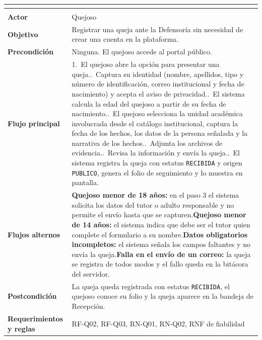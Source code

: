 \begingroup
{}
\small
\renewcommand{\arraystretch}{1.25}
\setlength{\tabcolsep}{4pt}
\begin{longtable}{|L{3.2cm}|L{12.4cm}|}
	\hline
	 \\
	\hline
	\endfirsthead
	\hline
	 \\
	\hline
	\endhead
	\textbf{Actor} & Quejoso \\ \hline
	\textbf{Objetivo} & Registrar una queja ante la Defensoría sin necesidad de crear una cuenta en la plataforma. \\ \hline
	\textbf{Precondición} & Ninguna. El quejoso accede al portal público. \\ \hline
	\textbf{Flujo principal} & 1.~El quejoso abre la opción para presentar una queja..~Captura su identidad (nombre, apellidos, tipo y número de identificación, correo institucional y fecha de nacimiento) y acepta el aviso de privacidad..~El sistema calcula la edad del quejoso a partir de su fecha de nacimiento..~El quejoso selecciona la unidad académica involucrada desde el catálogo institucional, captura la fecha de los hechos, los datos de la persona señalada y la narrativa de los hechos..~Adjunta los archivos de evidencia..~Revisa la información y envía la queja..~El sistema registra la queja con estatus \texttt{RECIBIDA} y origen \texttt{PUBLICO}, genera el folio de seguimiento y lo muestra en pantalla. \\ \hline
	\textbf{Flujos alternos} & \textbf{Quejoso menor de 18 años:} en el paso 3 el sistema solicita los datos del tutor o adulto responsable y no permite el envío hasta que se capturen.\newline \textbf{Quejoso menor de 14 años:} el sistema indica que debe ser el tutor quien complete el formulario a su nombre.\newline \textbf{Datos obligatorios incompletos:} el sistema señala los campos faltantes y no envía la queja.\newline \textbf{Falla en el envío de un correo:} la queja se registra de todos modos y el fallo queda en la bitácora del servidor. \\ \hline
	\textbf{Postcondición} & La queja queda registrada con estatus \texttt{RECIBIDA}, el quejoso conoce su folio y la queja aparece en la bandeja de Recepción. \\ \hline
	\textbf{Requerimientos y reglas} & RF-Q02, RF-Q03, RN-Q01, RN-Q02, RNF de fiabilidad \\ \hline
\end{longtable}
\endgroup

